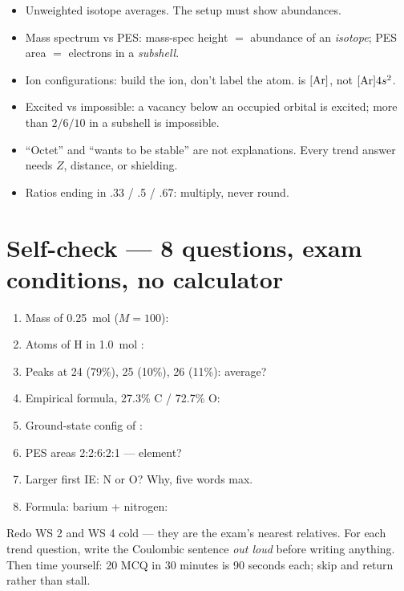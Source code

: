 \documentclass{apchem-worksheet}
\begin{document}
\begin{itemize}[leftmargin=*,itemsep=0.25em]
  \item Unweighted isotope averages. The setup must show abundances.
  \item Mass spectrum vs PES: mass-spec height $=$ abundance of an
        \emph{isotope}; PES area $=$ electrons in a \emph{subshell}.
  \item Ion configurations: build the ion, don't label the atom.
         is $[\ce{Ar}]$, not $[\ce{Ar}]4s^2$.
  \item Excited vs impossible: a vacancy below an occupied orbital is
        excited; more than $2/6/10$ in a subshell is impossible.
  \item ``Octet'' and ``wants to be stable'' are not explanations. Every
        trend answer needs $Z$, distance, or shielding.
  \item Ratios ending in .33 / .5 / .67: multiply, never round.
\end{itemize}

\section*{\sffamily Self-check --- 8 questions, exam conditions, no calculator}

\begin{enumerate}[leftmargin=*,itemsep=0.45em]
  \item Mass of \SI{0.25}{\mole}  ($M=100$):
  \item Atoms of H in \SI{1.0}{\mole} :
  \item Peaks at 24 (79\%), 25 (10\%), 26 (11\%): average?
  \item Empirical formula, 27.3\% C / 72.7\% O:
  \item Ground-state config of :
        \answerblank[3.5cm]{$[\ce{Ar}]$}
  \item PES areas 2:2:6:2:1 --- element?
  \item Larger first IE: N or O? Why, five words max.
  \item Formula: barium + nitrogen:
\end{enumerate}

\begin{apcnote}
Redo WS 2 and WS 4 cold --- they are the exam's nearest relatives. For each
trend question, write the Coulombic sentence \emph{out loud} before writing
anything. Then time yourself: 20 MCQ in 30 minutes is 90 seconds each; skip
and return rather than stall.
\end{apcnote}
\end{document}
